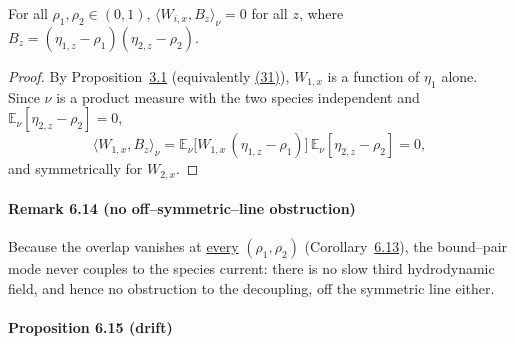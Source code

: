 \documentclass[11pt]{article}
\theoremstyle{plain}
\theoremstyle{definition}
\theoremstyle{remark}
\newcommand{\E}{\mathbb{E}}\newcommand{\PP}{\mathbb{P}}\newcommand{\dd}{\,\mathrm{d}}
\newcommand{\ip}[2]{\langle #1,#2\rangle_\nu}\newcommand{\bone}{\mathbf 1}
\begin{document}
For all $\rho_1,\rho_2\in(0,1)$, $\ip{W_{i,x}}{B_z}=0$ for all $z$, where
$B_z=(\eta_{1,z}-\rho_1)(\eta_{2,z}-\rho_2)$.
\par
\begin{proof}
By Proposition~\hyperref[prop_decouple]{3.1} (equivalently \hyperref[eq_Wgrad]{(31)}), $W_{1,x}$ is a
function of $\eta_1$ alone. Since $\nu$ is a product measure with the two species
independent and $\E_\nu[\eta_{2,z}-\rho_2]=0$,
\[
  \ip{W_{1,x}}{B_z}=\E_\nu\big[W_{1,x}\,(\eta_{1,z}-\rho_1)\big]\,\E_\nu[\eta_{2,z}-\rho_2]=0,
\]
and symmetrically for $W_{2,x}$.
\end{proof}

\paragraph{Remark 6.14 (no off--symmetric--line obstruction)}\label{rem_offline}

Because the overlap vanishes at \underline{every} $(\rho_1,\rho_2)$ (Corollary~\hyperref[prop_sym]{6.13}),
the bound--pair mode never couples to the species current: there is no slow third
hydrodynamic field, and hence no obstruction to the decoupling, off the symmetric line
either.
\par

\paragraph{Proposition 6.15 (drift)}\label{prop_drift}
\end{document}
